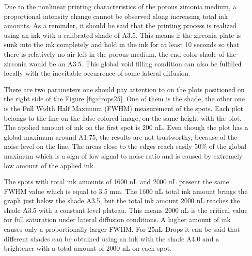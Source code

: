 \bigskip 

Due to the nonlinear printing characteristics of the porous zirconia medium, a proportional intensity change cannot be observed along increasing total ink amounts. As a reminder, it should be said that the printing process is realized using an ink with a calibrated shade of A3.5. This means if the zirconia plate is sunk into the ink completely and hold in the ink for at least 10 seconds so that there is relatively no air left in the porous medium, the end color shade of the zirconia would be an A3.5. This global void filling condition can also be fulfilled locally with the inevitable occurrence of some lateral diffusion. 

There are two parameters one should pay attention to on the plots positioned on the right side of the Figure \ref{fig:drops25}. One of them is the shade, the other one is the Full Width Half Maximum (FWHM) measurement of the spots. Each plot belongs to the line on the false colored image, on the same height with the plot. The applied amount of ink on the first spot is 200 nL. Even though the plot has a global maximum around A1.75, the results are not trustworthy, because of the noise level on the line. The areas close to the edges reach easily 50\% of the global maximum which is a sign of low signal to noise ratio and is caused by extremely low amount of the applied ink. 

The spots with total ink amounts of 1600 nL and 2000 nL present the same FWHM value which is equal to 3.5 mm. The 1600 nL total ink amount brings the graph just below the shade A3.5, but the total ink amount 2000 nL reaches the shade A3.5 with a constant level plateau. This means 2000 nL is the critical value for full saturation under lateral diffusion conditions. A higher amount of ink causes only a proportionally larger FWHM. For 25nL Drops it can be said that different shades can be obtained using an ink with the shade A4.0 and a brightener with a total amount of 2000 nL on each spot.

\bigskip

